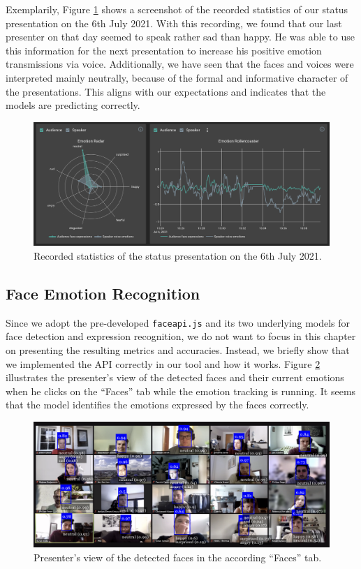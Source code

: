 Exemplarily, Figure \ref{fig:moody_statistics_screenshot} shows a screenshot of the recorded statistics of our status presentation on the 6th July 2021. With this recording, we found that our last presenter on that day seemed to speak rather sad than happy. He was able to use this information for the next presentation to increase his positive emotion transmissions via voice. Additionally, we have seen that the faces and voices were interpreted mainly neutrally, because of the formal and informative character of the presentations. This aligns with our expectations and indicates that the models are predicting correctly.

\begin{figure}
\centering
\includegraphics[width=1\textwidth]{assets/moody_statistics_screenshot.png}
\caption{Recorded statistics of the status presentation on the 6th July 2021.}
\label{fig:moody_statistics_screenshot}
\end{figure}

\subsection{Face Emotion Recognition}
\label{subsec:results_face_emotion_recognition}
Since we adopt the pre-developed \texttt{faceapi.js} and its two underlying models for face detection and expression recognition, we do not want to focus in this chapter on presenting the resulting metrics and accuracies. Instead, we briefly show that we implemented the API correctly in our tool and how it works. Figure \ref{fig:moody_faces_screenshot} illustrates the presenter's view of the detected faces and their current emotions when he clicks on the ``Faces'' tab while the emotion tracking is running. It seems that the model identifies the emotions expressed by the faces correctly.

\begin{figure}
\centering
\includegraphics[width=1\textwidth]{assets/moody_faces_screenshot.png}
\caption{Presenter's view of the detected faces in the according ``Faces'' tab.}
\label{fig:moody_faces_screenshot}
\end{figure}

